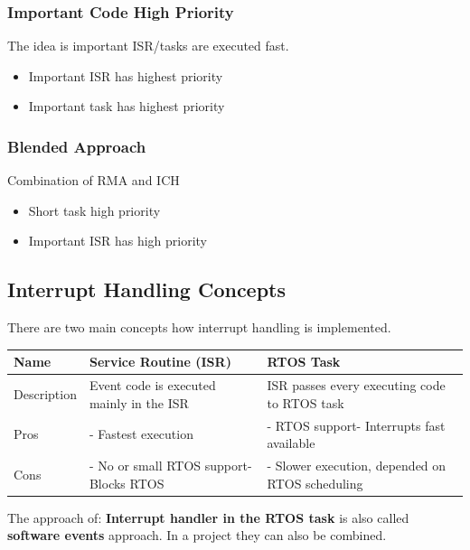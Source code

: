 \subsubsection{Important Code High Priority}
The idea is important ISR/tasks are executed fast.
\begin{itemize}
	\item Important ISR has highest priority
	\item Important task has highest priority
\end{itemize}

\subsubsection{Blended Approach}
Combination of RMA and ICH
\begin{itemize}
	\item Short task high priority
	\item Important ISR has high priority
\end{itemize}

\subsection{Interrupt Handling Concepts}
There are two main concepts how interrupt handling is implemented.

\begin{table}[h]
	\begin{tabularx}{\textwidth}{lXX}\hline
		Name        & Service Routine (ISR)                            & RTOS Task                                          \\\hline
		Description & Event code is executed mainly in the ISR         & ISR passes every executing code to RTOS task       \\
		Pros        & - Fastest execution                              & - RTOS support\newline - Interrupts fast available \\
		Cons        & - No or small RTOS support\newline - Blocks RTOS & - Slower execution, depended on RTOS scheduling    \\\hline
	\end{tabularx}
\end{table}

The approach of: \textbf{Interrupt handler in the RTOS task} is also called \textbf{software events} approach.
In a project they can also be combined.

